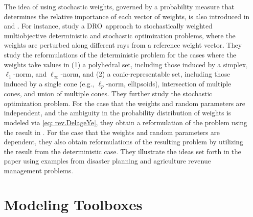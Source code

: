 \documentclass[final,onefignum,onetabnum]{class}
\newcommand{\dro}{DRO}
\begin{document}
The idea of using stochastic weights,  governed by a probability measure that determines the relative importance of each vector of weights, is also introduced in \citet{hu2012MO} and \citet{hu2014weighted}. For instance,  \citet{hu2012MO} study a \dro\ approach to stochastically weighted multiobjective deterministic and stochastic optimization problems, where the weights are perturbed along different rays from a reference weight vector. They study the reformulations of the deterministic problem for the cases where the weights take values in (1) a polyhedral set, including those induced by a simplex, $\ell_{1}$-norm, and $\ell_{\infty}$-norm, and (2) a conic-representable set,   including those induced by a single cone (e.g.,  $\ell_{p}$-norm, ellipsoids), intersection of multiple cones, and union of multiple cones.  They further study the stochastic optimization problem. For the case that the weights and random parameters are independent, and the ambiguity in the probability distribution of weights is modeled via \eqref{eq: rev.DelageYe}, they obtain a reformulation of the problem using the result in \citet{delage2010}. For the case that the weights and random parameters are dependent, they also obtain reformulations of the resulting problem by utilizing the result from the deterministic case. 
They illustrate the ideas set forth in the paper using examples from disaster planning  and  agriculture revenue management problems.  


\section{Modeling Toolboxes}
\label{sec: rev.toolboxes}
\end{document}
